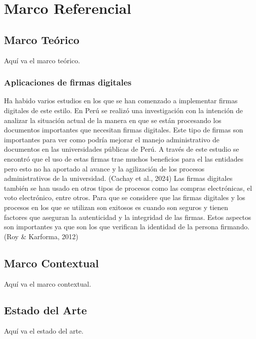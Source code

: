 \documentclass[a4paper,12pt]{report}
\begin{document}
\chapter{Marco Referencial}
\section{Marco Teórico}
Aquí va el marco teórico.
\subsection{Aplicaciones de firmas digitales}

Ha habido varios estudios en los que se han comenzado a implementar firmas digitales de este estilo. En Perú se realizó una investigación con la intención de analizar la situación actual de la manera en que se están procesando los documentos importantes que necesitan firmas digitales. Este tipo de firmas son importantes para ver como podría mejorar el manejo administrativo de documentos en las universidades públicas de Perú. A través de este estudio se encontró que el uso de estas firmas trae muchos beneficios para el las entidades pero esto no ha aportado al avance y la agilización de los procesos administrativos de la universidad. (Cachay et al., 2024) Las firmas digitales también se han usado en otros tipos de procesos como las compras electrónicas, el voto electrónico, entre otros. Para que se considere que las firmas digitales y los procesos en los que se utilizan son exitosos es cuando son seguros y tienen factores que aseguran la autenticidad y la integridad de las firmas. Estos aspectos son importantes ya que son los que verifican la identidad de la persona firmando. (Roy & Karforma, 2012)
\section{Marco Contextual}
Aquí va el marco contextual.

\section{Estado del Arte}
Aquí va el estado del arte.

\end{document}
